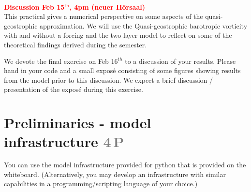 \documentclass[jobname=project, 10pt]{article}
\newcommand{\task}[2]{\section{#1 \hfill \normalsize\normalfont \textcolor{gray}{#2\,P}}\addtocounter{ptot}{#2}}
\newcounter{ptot}
\begin{document}
~\\[-3em]
\phantom{AA}\hfill \textcolor{red}{\textbf{Discussion Feb 15$^\mathrm{th}$, 4pm (neuer H\"orsaal)}} \\
This practical gives a numerical perspective on some aspects of the quasi-geostrophic approximation.
We will use the Quasi-geostrophic barotropic vorticity with and without a forcing and the two-layer model
to reflect on some of the theoretical findings derived during the semester.
%
\par
% 
We devote the final exercise on Feb 16$^{th}$ to a discussion of your results. Please hand in your code and a small expos\'e consisting of some figures showing results from the model prior to this discussion. We expect a brief discussion / presentation of the expos\'e during this exercise. 

\task{Preliminaries - model infrastructure}{4}

You can use the model infrastructure provided for python that is provided on the whiteboard. (Alternatively, you may develop an infrastructure with similar capabilities in a programming/scripting language of your choice.) \\ 
\end{document}
